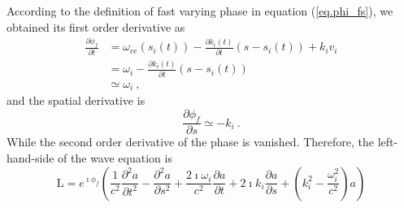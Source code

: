 According to the definition of fast varying phase in equation (\ref{eq.phi_fs}), we obtained its first order derivative as
\begin{equation}
    \begin{aligned}
    \frac{\partial \phi_f}{\partial t} & = \omega_{ce}(s_i(t)) - \frac{\partial k_i(t)}{\partial t}(s-s_i(t)) + k_i v_i
    \\
    & = \omega_i - \frac{\partial k_i(t)}{\partial t}(s-s_i(t))
    \\
    &\simeq \omega_i~,
    \end{aligned}
\end{equation}
and the spatial derivative is 
\begin{equation}
    \frac{\partial \phi_f}{\partial s} \simeq - k_i~.
\end{equation}
While the second order derivative of the phase is vanished.
Therefore, the left-hand-side of the wave equation is 
\begin{equation}
    \mathrm{L} = e^{\imath \phi_f} \left(\frac{1}{c^2}\frac{\partial^2 a}{\partial t^2} - \frac{\partial^2 a}{\partial s^2} + \frac{2 \imath \omega_i}{c^2} \frac{\partial a}{\partial t}+ 2 \imath k_i \frac{\partial a}{\partial s} + (k_i^2 - \frac{\omega_i^2}{c^2})a\right)
\end{equation}

